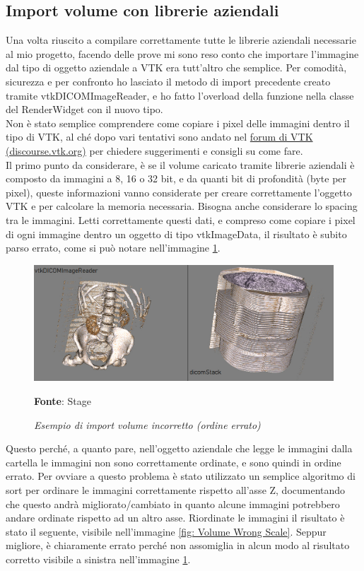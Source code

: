 \subsection{Import volume con librerie aziendali}
Una volta riuscito a compilare correttamente tutte le librerie aziendali necessarie al mio progetto, facendo delle prove mi sono reso conto che importare l'immagine dal tipo di oggetto aziendale a VTK era tutt'altro che semplice. Per comodità, sicurezza e per confronto ho lasciato il metodo di import precedente creato tramite vtkDICOMImageReader, e ho fatto l'overload della funzione nella classe del RenderWidget con il nuovo tipo.
\\
Non è stato semplice comprendere come copiare i pixel delle immagini dentro il tipo di VTK, al ché dopo vari tentativi sono andato nel \href{https://discourse.vtk.org/t/trying-to-load-custom-loaded-images-into-vtkimageimport/3704}{forum di VTK (discourse.vtk.org)} per chiedere suggerimenti e consigli su come fare.
\\
Il primo punto da considerare, è se il volume caricato tramite librerie aziendali è composto da immagini a 8, 16 o 32 bit, e da quanti bit di profondità (byte per pixel), queste informazioni vanno considerate per creare correttamente l'oggetto VTK e per calcolare la memoria necessaria. Bisogna anche considerare lo spacing tra le immagini. Letti correttamente questi dati, e compreso come copiare i pixel di ogni immagine dentro un oggetto di tipo vtkImageData, il risultato è subito parso errato, come si può notare nell'immagine \ref{fig: Volume Wrong Order}.

\begin{figure}[h]
    \centering
    \includegraphics[width=1\textwidth]{immagini/svolgimento/volumebrokenorder.jpg}
    \caption{\textit{Esempio di import volume incorretto (ordine errato)}}
    \textbf{Fonte}: Stage
    \label{fig: Volume Wrong Order}
\end{figure}

Questo perché, a quanto pare, nell'oggetto aziendale che legge le immagini dalla cartella le immagini non sono correttamente ordinate, e sono quindi in ordine errato. Per ovviare a questo problema è stato utilizzato un semplice algoritmo di sort per ordinare le immagini correttamente rispetto all'asse Z, documentando che questo andrà migliorato/cambiato in quanto alcune immagini potrebbero andare ordinate rispetto ad un altro asse. Riordinate le immagini il risultato è stato il seguente, visibile nell'immagine \ref{fig: Volume Wrong Scale}. Seppur migliore, è chiaramente errato perché non assomiglia in alcun modo al risultato corretto visibile a sinistra nell'immagine \ref{fig: Volume Wrong Order}.


